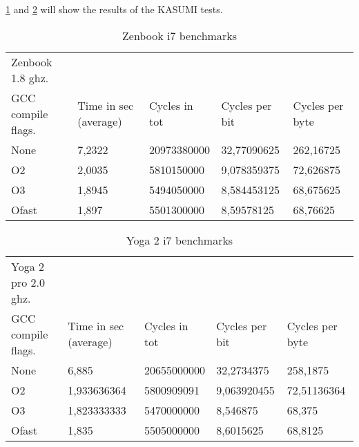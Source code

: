 \ref{tab:zen} and \ref{tab:yoga} will show the results of the KASUMI
tests.
\begin{table}[h!]
    \begin{tabular}{l|l|l|l|l}
     Zenbook 1.8 ghz.  & ~                     & ~             & ~              & ~               \\
    GCC compile flags. & Time in sec (average) & Cycles in tot & Cycles per bit & Cycles per byte \\ \hline
    None               & 7,2322                & 20973380000   & 32,77090625    & 262,16725       \\ \hline
    O2                 & 2,0035                & 5810150000    & 9,078359375    & 72,626875       \\ \hline
    O3                 & 1,8945                & 5494050000    & 8,584453125    & 68,675625       \\ \hline
    Ofast              & 1,897                 & 5501300000    & 8,59578125     & 68,76625        \\
    \end{tabular}
    \caption{Zenbook i7 benchmarks}
    \label{tab:zen}
\end{table}
\begin{table}[h!]
    \begin{tabular}{l|l|l|l|l}
     Yoga 2 pro 2.0 ghz. & ~                     & ~             & ~              & ~               \\
    GCC compile flags.   & Time in sec (average) & Cycles in tot & Cycles per bit & Cycles per byte \\ \hline
    None                 & 6,885                 & 20655000000   & 32,2734375     & 258,1875        \\ \hline
    O2                   & 1,933636364           & 5800909091    & 9,063920455    & 72,51136364     \\ \hline
    O3                   & 1,823333333           & 5470000000    & 8,546875       & 68,375          \\ \hline
    Ofast                & 1,835                 & 5505000000    & 8,6015625      & 68,8125         \\
    \end{tabular}
    \caption{Yoga 2 i7 benchmarks}
    \label{tab:yoga}
\end{table}\\


